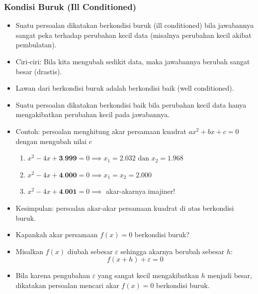 \documentclass[pdflatex,compress]{beamer}
\begin{document}
\begin{frame}
	\frametitle{Kondisi Buruk (Ill Conditioned)}
	\begin{itemize}
		\item Suatu persoalan dikatakan berkondisi buruk (ill conditioned) bila jawabannya sangat peka terhadap perubahan kecil data (misalnya perubahan kecil akibat pembulatan).
		\item Ciri-ciri: Bila kita mengubah sedikit data, maka jawabannya berubah sangat besar (drastis).
		\item Lawan dari berkondisi buruk adalah berkondisi baik (well conditioned).
		\item Suatu persoalan dikatakan berkondisi baik bila perubahan kecil data hanya mengakibatkan perubahan kecil pada jawabannya.
	\end{itemize}
\end{frame}

\begin{frame}
	\begin{itemize}
		\item Contoh: persoalan menghitung akar persamaan kuadrat $ ax^2 + bx + c = 0 $ dengan mengubah nilai $ c $
		\begin{enumerate}
			\item $ x^2 - 4x + \textbf{3.999} = 0 \implies x_1 = 2.032 \text{ dan } x_2 = 1.968 $
			\item $ x^2 - 4x + \textbf{4.000} = 0 \implies x_1 = x_2 = 2.000 $
			\item $ x^2 - 4x + \textbf{4.001} = 0 \implies $ akar-akarnya imajiner!
		\end{enumerate}
		\item Kesimpulan: persoalan akar-akar persamaan kuadrat di atas berkondisi buruk.
	\end{itemize}
\end{frame}

\begin{frame}
	\begin{itemize}
		\item Kapankah akar persamaan $ f(x) = 0 $ berkondisi buruk?
		\item Misalkan $ f(x) $ diubah sebesar $\varepsilon$ sehingga akarnya berubah sebesar $ h $:
		\[f(x + h) + \varepsilon = 0\]
		\item Bila karena pengubahan $ \varepsilon $ yang sangat kecil mengakibatkan $ h $ menjadi besar, dikatakan persoalan mencari akar $ f(x) = 0 $ berkondisi buruk.
	\end{itemize}
\end{frame}
\end{document}
